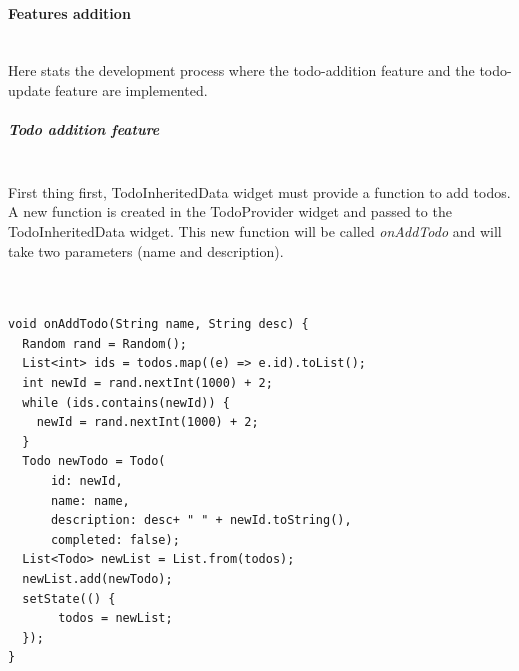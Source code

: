 \paragraph{Features addition} \mbox{} \\
\label{par:feature_addition_inherited_widget}
Here stats the development process where the todo-addition feature and the todo-update feature are implemented.

\subparagraph{Todo addition feature} \mbox{} \\
\label{subpar: todo_addition_feature_inherited_widget}
First thing first, TodoInheritedData widget must provide a function to add todos. A new function is created in the TodoProvider widget and passed to the TodoInheritedData widget. This new function will be called \textit{onAddTodo} and will take two parameters (name and description).
\mbox{}\\


\mbox{}\\
\begin{code}
\label{code:2.31}
\begin{verbatim}

void onAddTodo(String name, String desc) {
  Random rand = Random();
  List<int> ids = todos.map((e) => e.id).toList();
  int newId = rand.nextInt(1000) + 2;
  while (ids.contains(newId)) {
    newId = rand.nextInt(1000) + 2;
  }
  Todo newTodo = Todo(
      id: newId,
      name: name,
      description: desc+ " " + newId.toString(),
      completed: false);
  List<Todo> newList = List.from(todos);
  newList.add(newTodo);
  setState(() {
       todos = newList;
  });
}
\end{verbatim}
\end{code}
\mbox{}\\

